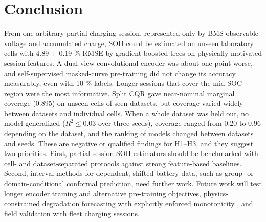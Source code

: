 \documentclass[journal]{IEEEtran}
\begin{document}
\section{Conclusion}
From one arbitrary partial charging session, represented only by BMS-observable voltage and accumulated charge, SOH could be estimated on unseen laboratory cells with 4.89 $\pm$ 0.19 \% RMSE by gradient-boosted trees on physically motivated session features. A dual-view convolutional encoder was about one point worse, and self-supervised masked-curve pre-training did not change its accuracy measurably, even with 10 \% labels. Longer sessions that cover the mid-SOC region were the most informative. Split CQR gave near-nominal marginal coverage (0.895) on unseen cells of seen datasets, but coverage varied widely between datasets and individual cells. When a whole dataset was held out, no model generalized (\(R^2\le0.03\) over three seeds), coverage ranged from 0.20 to 0.96 depending on the dataset, and the ranking of models changed between datasets and seeds. These are negative or qualified findings for H1--H3, and they suggest two priorities. First, partial-session SOH estimators should be benchmarked with cell- and dataset-separated protocols against strong feature-based baselines. Second, interval methods for dependent, shifted battery data, such as group- or domain-conditional conformal prediction, need further work. Future work will test longer encoder training and alternative pre-training objectives, physics-constrained degradation forecasting with explicitly enforced monotonicity \cite{b18}, and field validation with fleet charging sessions.
\end{document}
